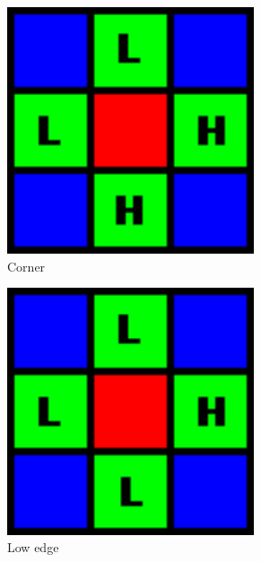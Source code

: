 \documentclass[a4paper,oneside]{article}
\begin{document}
\begin{figure}[htbp]
  \centering
  \begin{subfigure}{0.2\textwidth}
    \centering
    \includegraphics[width=0.8\textwidth]{include_imgs/pri_corner}
    \caption{Corner}
    \label{fig:corner}
  \end{subfigure}%
  \begin{subfigure}{0.2\textwidth}
    \centering
    \includegraphics[width=0.8\textwidth]{include_imgs/pri_lowedge}
    \caption{Low edge}
    \label{fig:lowedge}
  \end{subfigure}%
  \begin{subfigure}{0.2\textwidth}

\end{subfigure}
\end{figure}
\end{document}
